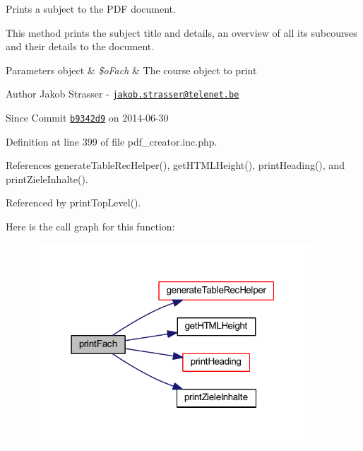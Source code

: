 Prints a subject to the P\+D\+F document. 

This method prints the subject title and details, an overview of all its subcourses and their details to the document.


\begin{DoxyParams}[1]{Parameters}
object & {\em \$o\+Fach} & The course object to print\\
\hline
\end{DoxyParams}
\begin{DoxyAuthor}{Author}
Jakob Strasser -\/ \href{mailto:jakob.strasser@telenet.be}{\tt jakob.\+strasser@telenet.\+be} 
\end{DoxyAuthor}
\begin{DoxySince}{Since}
Commit \href{http://github.com/TheJake123/DrupalModul/commit/b9342d941b3f93e212f3f6af0823a07524dd5954}{\tt b9342d9} on 2014-\/06-\/30 
\end{DoxySince}


Definition at line 399 of file pdf\+\_\+creator.\+inc.\+php.



References generate\+Table\+Rec\+Helper(), get\+H\+T\+M\+L\+Height(), print\+Heading(), and print\+Ziele\+Inhalte().



Referenced by print\+Top\+Level().



Here is the call graph for this function\+:
\nopagebreak
\begin{figure}[H]
\begin{center}
\leavevmode
\includegraphics[width=295pt]{classoverview_p_d_f_abf0674d88080affc25c472fbd0525896_cgraph}
\end{center}
\end{figure}




